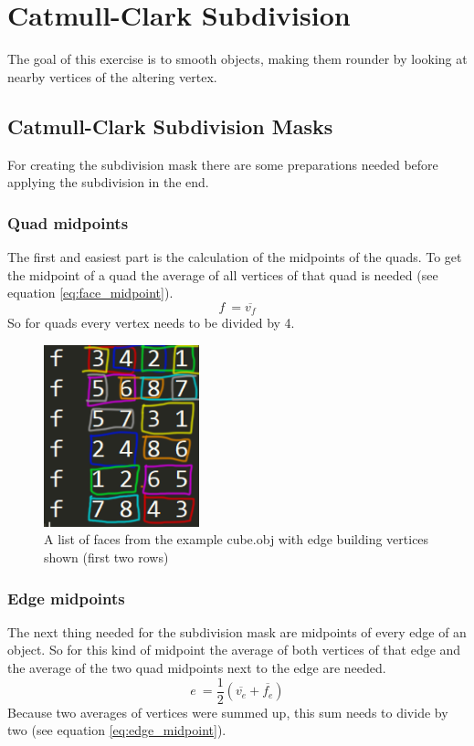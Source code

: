\documentclass[11.5pt,oneside,a4paper]{scrartcl}
\newcounter{ct}
\begin{document}
\section{Catmull-Clark Subdivision}
The goal of this exercise is to smooth objects, making them rounder by looking at nearby vertices of the altering vertex.

\subsection{Catmull-Clark Subdivision Masks}
For creating the subdivision mask there are some preparations needed before applying the subdivision in the end.

\subsubsection{Quad midpoints}
The first and easiest part is the calculation of the midpoints of the quads. To get the midpoint of a quad the average of all vertices of that quad is needed (see equation \ref{eq:face_midpoint}).
\begin{equation} \label{eq:face_midpoint}
        f \ = \overline{v_{f}}
\end{equation} 
So for quads every vertex needs to be divided by 4.

\begin{figure}
	\centering
	\includegraphics[width=0.4\textwidth]{faces.png}
	\caption{A list of faces from the example cube.obj with edge building vertices shown (first two rows)}
	\label{fig:faces}
\end{figure}

\subsubsection{Edge midpoints}
The next thing needed for the subdivision mask are midpoints of every edge of an object. So for this kind of midpoint the average of both vertices of that edge and the average of the two quad midpoints next to the edge are needed.
\begin{equation} \label{eq:edge_midpoint}
        e \ = \frac{1}{2} ( \overline{v_{e}} + \overline{f_{e}} )
\end{equation} 
Because two averages of vertices were summed up, this sum needs to divide by two (see equation \ref{eq:edge_midpoint}).
\end{document}
